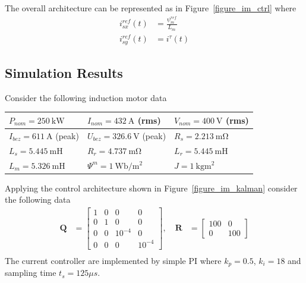 \documentclass[11pt,a4paper,oneside]{book}
\numberwithin{equation}{section}
\theoremstyle{it}
\theoremstyle{definition}
\begin{document}
The overall architecture can be represented as in Figure~\ref{figure_im_ctrl} where
\begin{equation}\label{im_control_problem_eq_20}
	\begin{aligned}
		i_{sx}^{ref}(t) &= \frac{\psi_m^{ref}}{L_m} \\[6pt]
		i_{sy}^{ref}(t) &= i^{\tau}(t)
	\end{aligned}
\end{equation}

\subsection{Simulation Results}
Consider the following induction motor data
\setlength\arrayrulewidth{1pt}
\begin{center}
	\setlength{\extrarowheight}{6pt}
	\begin{tabular}{ | m{10em} | m{10em} | m{10em} |}
		\hline
		$P_{nom} = \SI{250}{\kilo\watt}$ & $I_{nom} = \SI{432}{\ampere}$ (rms) 
		& $V_{nom} = \SI{400}{\volt}$ (rms) \\[6pt]
		\hline
		$I_{bez} = \SI{611}{\ampere}$ (peak) & $U_{bez} = \SI{326.6}{\volt}$ 
		(peak) & $R_{s} = \SI{2.213}{\milli\ohm}$ \\[6pt]
		\hline
		$L_{s} = \SI{5.445}{\milli\henry}$ & $R_{r} = \SI{4.737}{\milli\ohm}$ & 
		$L_{r} = \SI{5.445}{\milli\henry}$ \\[6pt]
		\hline
		$L_{m} = \SI{5.326}{\milli\henry}$ & $\Psi^m = 
		\SI{1}{\weber\per\square\meter}$ & $J = \SI{1}{\kilogram\square\meter}$ 
		\\[6pt]
		\hline
	\end{tabular}
	\captionsetup{width=0.75\textwidth}		
	\label{im_data}
\end{center}

Applying the control architecture shown in Figure~\ref{figure_im_kalman} consider 
the following data
\begin{equation*}
	\begin{aligned}
		\mathbf{Q} &= 
		\begin{bmatrix} 
			1&0&0&0\\[6pt] 
			0&1&0&0\\[6pt] 
			0&0&10^{-4}&0\\[6pt]
			0&0&0&10^{-4}
		\end{bmatrix},\quad
		\mathbf{R} &= \begin{bmatrix} 100&0\\[6pt]
			0&100\end{bmatrix} \\[6pt]
	\end{aligned}
\end{equation*}
The current controller are implemented by simple PI where $	k_p = 0.5$, 
$k_i=18$ and sampling time $t_s=125\mu s$.
\end{document}
